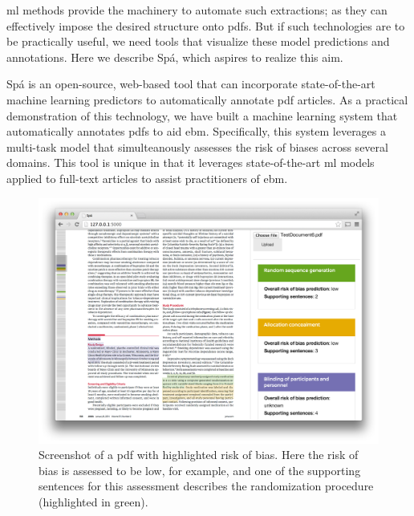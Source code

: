 \documentclass[runningheads,a4paper]{llncs}
\begin{document}
\ac{ml} methods provide the machinery to automate such extractions; as they can effectively impose the desired structure onto \acp{pdf}.
But if such technologies are to be practically useful, we need tools that visualize these model predictions and annotations.
Here we describe Spá, which aspires to realize this aim.

Spá is an open-source, web-based tool that can incorporate state-of-the-art machine learning predictors to automatically annotate \ac{pdf} articles.
As a practical demonstration of this technology, we have built a machine learning system that automatically annotates \acp{pdf} to aid \ac{ebm}.
Specifically, this system leverages a multi-task model that simulteanously assesses the risk of biases across several domains.
This tool is unique in that it leverages state-of-the-art \ac{ml} models applied to full-text articles to assist practitioners of \ac{ebm}.

\begin{figure}[htb]
\vspace{-1em}
\centering
\includegraphics[width=0.8\linewidth]{./images/screenshot2.png}
\vspace{-1em}
\caption{\label{fig:screenshot}Screenshot of a \ac{pdf} with highlighted risk of bias. Here the risk of bias is assessed to be low, for example, and one of the supporting sentences for this assessment describes the randomization procedure (highlighted in green).}
\vspace{-1em}
\end{figure}
\end{document}
